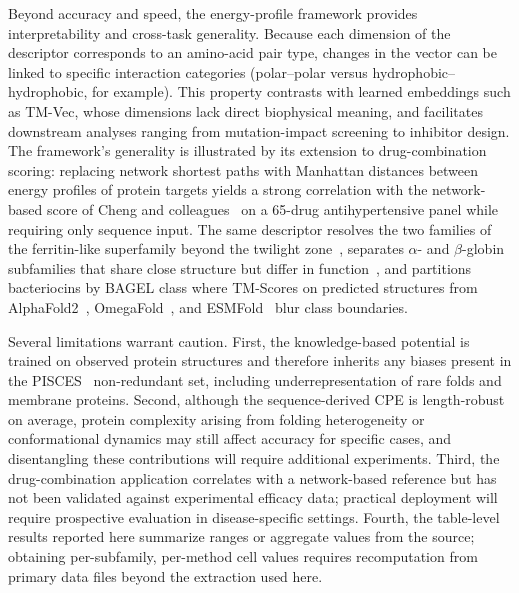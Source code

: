 \documentclass[11pt]{article}
\begin{document}
Beyond accuracy and speed, the energy-profile framework provides
interpretability and cross-task generality. Because each dimension of the
descriptor corresponds to an amino-acid pair type, changes in the vector
can be linked to specific interaction categories (polar--polar versus
hydrophobic--hydrophobic, for example). This property contrasts with
learned embeddings such as TM-Vec, whose dimensions lack direct biophysical
meaning, and facilitates downstream analyses ranging from mutation-impact
screening to inhibitor design. The framework's generality is illustrated
by its extension to drug-combination scoring: replacing network shortest
paths with Manhattan distances between energy profiles of protein targets
yields a strong correlation with the network-based score of Cheng and
colleagues~\citep{zhou2020network} on a 65-drug antihypertensive panel
while requiring only sequence input. The same descriptor resolves the two
families of the ferritin-like superfamily beyond the twilight
zone~\citep{chothia1986twilight,lundin2012ferritin}, separates
$\alpha$- and $\beta$-globin subfamilies that share close structure but
differ in function~\citep{freiberger2023frustration}, and partitions
bacteriocins by BAGEL class where TM-Scores on predicted structures from
AlphaFold2~\citep{jumper2021alphafold}, OmegaFold~\citep{wu2022omegafold},
and ESMFold~\citep{lin2023esmfold} blur class boundaries.

Several limitations warrant caution. First, the knowledge-based potential
is trained on observed protein structures and therefore inherits any biases
present in the PISCES~\citep{wang2003pisces} non-redundant set, including
underrepresentation of rare folds and membrane proteins. Second, although
the sequence-derived CPE is length-robust on average, protein complexity
arising from folding heterogeneity or conformational dynamics may still
affect accuracy for specific cases, and disentangling these contributions
will require additional experiments. Third, the drug-combination
application correlates with a network-based reference but has not been
validated against experimental efficacy data; practical deployment will
require prospective evaluation in disease-specific settings. Fourth, the
table-level results reported here summarize ranges or aggregate values
from the source; obtaining per-subfamily, per-method cell values requires
recomputation from primary data files beyond the extraction used here.
\end{document}
